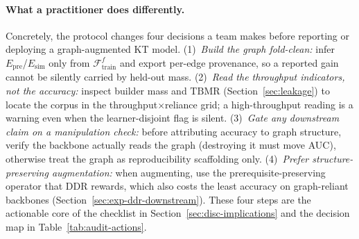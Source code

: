 \documentclass[pdflatex,sn-mathphys-num]{sn-jnl}
\newcommand{\Epre}{\ensuremath{E_{\text{pre}}}}
\newcommand{\Esim}{\ensuremath{E_{\text{sim}}}}
\newcommand{\DDR}{\textsc{DDR}}
\newenvironment{revbox}{}{}
\begin{document}
\begin{revbox}
\paragraph{What a practitioner does differently.}
Concretely, the protocol changes four decisions a team makes before reporting or
deploying a graph-augmented KT model. (1)~\emph{Build the graph fold-clean:}
infer $\Epre$/$\Esim$ only from $\mathcal{F}^f_{\text{train}}$ and export
per-edge provenance, so a reported gain cannot be silently carried by held-out
mass. (2)~\emph{Read the throughput indicators, not the accuracy:} inspect
builder mass and $\mathrm{TBMR}$ (Section~\ref{sec:leakage}) to locate
the corpus in the throughput$\times$reliance grid; a high-throughput reading is
a warning even when the learner-disjoint flag is silent. (3)~\emph{Gate any
downstream claim on a manipulation check:} before attributing accuracy to graph
structure, verify the backbone actually reads the graph (destroying it must move
AUC), otherwise treat the graph as reproducibility scaffolding only. (4)~\emph{Prefer
structure-preserving augmentation:} when augmenting, use the
prerequisite-preserving operator that \DDR{} rewards, which also costs the least
accuracy on graph-reliant backbones (Section~\ref{sec:exp-ddr-downstream}). These
four steps are the actionable core of the checklist in
Section~\ref{sec:disc-implications} and the decision map in
Table~\ref{tab:audit-actions}.
\end{revbox}
\end{document}
